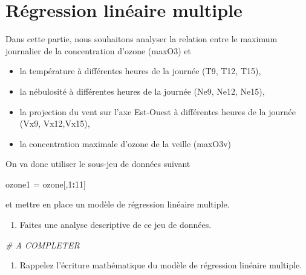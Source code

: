 \documentclass[
]{article}
\newenvironment{Shaded}{\begin{snugshade}}{\end{snugshade}}
\newcommand{\CommentTok}[1]{\textcolor[rgb]{0.56,0.35,0.01}{\textit{#1}}}
\newcommand{\DecValTok}[1]{\textcolor[rgb]{0.00,0.00,0.81}{#1}}
\newcommand{\NormalTok}[1]{#1}
\newcommand{\OtherTok}[1]{\textcolor[rgb]{0.56,0.35,0.01}{#1}}
\newcommand{\SpecialCharTok}[1]{\textcolor[rgb]{0.81,0.36,0.00}{\textbf{#1}}}
\providecommand{\tightlist}{%
  \setlength{\itemsep}{0pt}\setlength{\parskip}{0pt}}
\begin{document}
\hypertarget{ruxe9gression-linuxe9aire-multiple}{%
\section{Régression linéaire
multiple}\label{ruxe9gression-linuxe9aire-multiple}}

Dans cette partie, nous souhaitons analyser la relation entre le maximum
journalier de la concentration d'ozone (maxO3) et

\begin{itemize}
\tightlist
\item
  la température à différentes heures de la journée (T9, T12, T15),
\item
  la nébulosité à différentes heures de la journée (Ne9, Ne12, Ne15),
\item
  la projection du vent sur l'axe Est-Ouest à différentes heures de la
  journée (Vx9, Vx12,Vx15),
\item
  la concentration maximale d'ozone de la veille (maxO3v)
\end{itemize}

On va donc utiliser le sous-jeu de données suivant

\begin{Shaded}
\begin{Highlighting}[]
\NormalTok{ozone1 }\OtherTok{=}\NormalTok{ ozone[,}\DecValTok{1}\SpecialCharTok{:}\DecValTok{11}\NormalTok{]}
\end{Highlighting}
\end{Shaded}

et mettre en place un modèle de régression linéaire multiple.

\begin{enumerate}
\def\labelenumi{\arabic{enumi}.}
\tightlist
\item
  Faites une analyse descriptive de ce jeu de données.
\end{enumerate}

\begin{Shaded}
\begin{Highlighting}[]
\CommentTok{\# A COMPLETER}
\end{Highlighting}
\end{Shaded}

\begin{enumerate}
\def\labelenumi{\arabic{enumi}.}
\setcounter{enumi}{1}
\tightlist
\item
  Rappelez l'écriture mathématique du modèle de régression linéaire
  multiple.
\end{enumerate}
\end{document}
